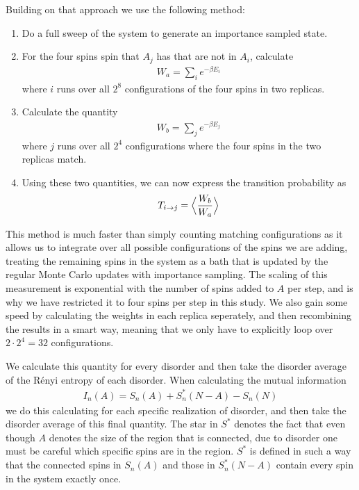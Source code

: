 \documentclass{article}
\begin{document}
Building on that approach we use the following method:
\begin{enumerate}
\item Do a full sweep of the system to generate an importance sampled state.
\item For the four spins spin that $A_j$ has that are not in $A_i$, calculate 
\begin{align}
W_a = \sum_i e^{-\beta E_i}
\end{align}
where $i$ runs over all $2^8$ configurations of the four spins in two replicas.
\item Calculate the quantity
\begin{align}
W_b = \sum_j e^{-\beta E_j}
\end{align}
where $j$ runs over all $2^4$ configurations where the four spins in the two replicas match.
\item Using these two quantities, we can now express the transition probability as
\begin{align}
T_{i \rightarrow j} = \Bigl< \frac{W_b}{W_a} \Bigr>
\end{align}
\end{enumerate}

This method is much faster than simply counting matching configurations as it allows us to integrate over all possible configurations of the spins we are adding, treating the remaining spins in the system as a bath that is updated by the regular Monte Carlo updates with importance sampling.
The scaling of this measurement is exponential with the number of spins added to $A$ per step, and is why we have restricted it to four spins per step in this study.
We also gain some speed by calculating the weights in each replica seperately, and then recombining the results in a smart way, meaning that we only have to explicitly loop over $2 \cdot 2^4 = 32$ configurations.

We calculate this quantity for every disorder and then take the disorder average of the R\'enyi entropy of each disorder.
When calculating the mutual information
\begin{align}
I_{n}(A) = S_{n}(A) + S^*_{n}(N-A) - S_{n}(N)
\end{align}
we do this calculating for each specific realization of disorder, and then take the disorder average of this final quantity.
The star in $S^*$ denotes the fact that even though $A$ denotes the size of the region that is connected, due to disorder one must be careful which specific spins are in the region.
$S^*$ is defined in such a way that the connected spins in $S_{n}(A)$ and those in $S^*_{n}(N-A)$ contain every spin in the system exactly once.


\end{document}
